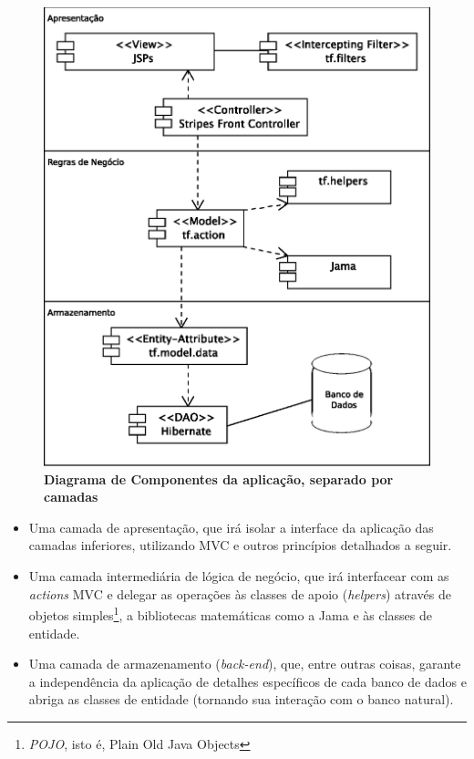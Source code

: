 \documentclass{abnt}
\begin{document}
\begin{figure}
\begin{center}
\includegraphics[scale=0.8]{deployment.eps}
\caption{{\bf Diagrama de Componentes da aplicação, separado por camadas}}
\label{deployment}
\end{center}
\end{figure}


\begin{itemize}
\item Uma camada de apresentação, que irá isolar a interface da aplicação das camadas inferiores, utilizando MVC e outros princípios detalhados a seguir.

\item Uma camada intermediária de lógica de negócio, que irá interfacear com as \textit{actions} MVC e delegar as operações às classes de apoio (\textit{helpers}) através de objetos simples\footnote{\textit{POJO}, isto é, Plain Old Java Objects}, a bibliotecas matemáticas como a Jama e às classes de entidade.

\item Uma camada de armazenamento (\textit{back-end}), que, entre outras coisas, garante a independência da aplicação de detalhes específicos de cada banco de dados e abriga as classes de entidade (tornando sua interação com o banco natural).

\end{itemize}
\end{document}

